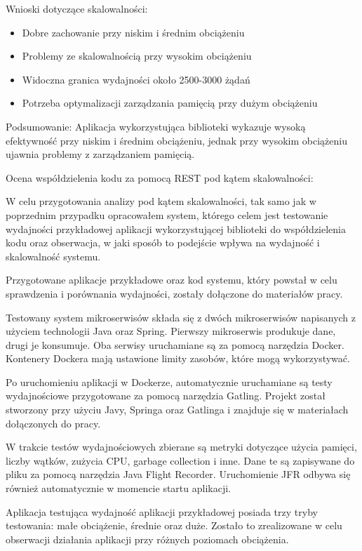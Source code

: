 \documentclass[runningheads,12pt]{llncs}
\begin{document}
Wnioski dotyczące skalowalności: 
\begin{itemize} 
    \item Dobre zachowanie przy niskim i średnim obciążeniu 
    \item Problemy ze skalowalnością przy wysokim obciążeniu 
    \item Widoczna granica wydajności około 2500-3000 żądań 
    \item Potrzeba optymalizacji zarządzania pamięcią przy dużym obciążeniu 
\end{itemize}

Podsumowanie: Aplikacja wykorzystująca biblioteki wykazuje wysoką efektywność przy niskim i średnim obciążeniu, jednak przy wysokim obciążeniu ujawnia problemy z zarządzaniem pamięcią.

\newpage


Ocena współdzielenia kodu za pomocą REST pod kątem skalowalności:

W celu przygotowania analizy pod kątem skalowalności, tak samo jak w poprzednim przypadku opracowałem system, którego celem jest testowanie wydajności przykładowej aplikacji wykorzystującej biblioteki do współdzielenia kodu oraz obserwacja, w jaki sposób to podejście wpływa na wydajność i skalowalność systemu.

Przygotowane aplikacje przykładowe oraz kod systemu, który powstał w celu sprawdzenia i porównania wydajności, zostały dołączone do materiałów pracy.

Testowany system mikroserwisów składa się z dwóch mikroserwisów napisanych z użyciem technologii Java oraz Spring. Pierwszy mikroserwis produkuje dane, drugi je konsumuje. Oba serwisy uruchamiane są za pomocą narzędzia Docker. Kontenery Dockera mają ustawione limity zasobów, które mogą wykorzystywać.

Po uruchomieniu aplikacji w Dockerze, automatycznie uruchamiane są testy wydajnościowe przygotowane za pomocą narzędzia Gatling. Projekt został stworzony przy użyciu Javy, Springa oraz Gatlinga i znajduje się w materiałach dołączonych do pracy.

W trakcie testów wydajnościowych zbierane są metryki dotyczące użycia pamięci, liczby wątków, zużycia CPU, garbage collection i inne. Dane te są zapisywane do pliku za pomocą narzędzia Java Flight Recorder. Uruchomienie JFR odbywa się również automatycznie w momencie startu aplikacji.

Aplikacja testująca wydajność aplikacji przykładowej posiada trzy tryby testowania: małe obciążenie, średnie oraz duże. Zostało to zrealizowane w celu obserwacji działania aplikacji przy różnych poziomach obciążenia.
\end{document}
